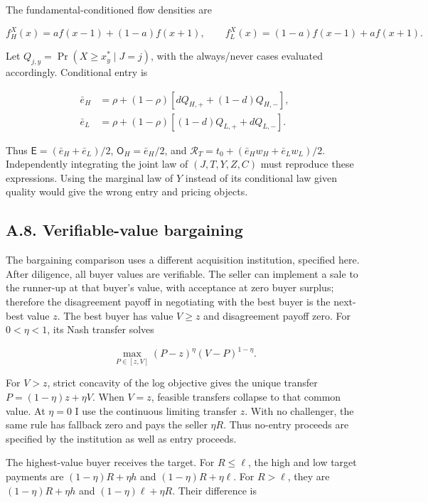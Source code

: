 \documentclass[
  11pt,
]{article}
\begin{document}
The fundamental-conditioned flow densities are

\[
f_H^X(x)=a f(x-1)+(1-a)f(x+1),\qquad
f_L^X(x)=(1-a)f(x-1)+a f(x+1).
\tag{OA.40}\label{eq:oa-oa-40}
\]

Let \(Q_{j,y}=\Pr(X\ge x_y^*\mid J=j)\), with the
always/never cases evaluated accordingly. Conditional entry is

\[
\begin{aligned}
\bar e_H&=\rho+(1-\rho)[dQ_{H,+}+(1-d)Q_{H,-}],\\
\bar e_L&=\rho+(1-\rho)[(1-d)Q_{L,+}+dQ_{L,-}].
\end{aligned}
\tag{OA.41}\label{eq:oa-oa-41}
\]

Thus \(\mathsf E=(\bar e_H+\bar e_L)/2\), \(\mathsf O_H=\bar e_H/2\),
and \(\mathcal R_T=t_0+(\bar e_Hw_H+\bar e_Lw_L)/2\). Independently
integrating the joint law of \((J,T,Y,Z,C)\) must reproduce these
expressions. Using the marginal law of \(Y\) instead of its conditional
law given quality would give the wrong entry and pricing objects.

\subsection{A.8. Verifiable-value bargaining}\label{oa-a-bargaining}

The bargaining comparison uses a different acquisition institution,
specified here. After diligence, all buyer values are verifiable. The
seller can implement a sale to the runner-up at that buyer's value, with
acceptance at zero buyer surplus; therefore the disagreement payoff in
negotiating with the best buyer is the next-best value \(z\). The best
buyer has value \(V\ge z\) and disagreement payoff zero. For
\(0<\eta<1\), its Nash transfer solves

\[
\max_{P\in[z,V]}(P-z)^\eta(V-P)^{1-\eta}.
\tag{OA.42}\label{eq:oa-oa-42}
\]

For \(V>z\), strict concavity of the log objective gives the unique
transfer \(P=(1-\eta)z+\eta V\). When \(V=z\), feasible transfers
collapse to that common value. At \(\eta=0\) I use the continuous
limiting transfer \(z\). With no challenger, the same rule has fallback
zero and pays the seller \(\eta R\). Thus no-entry proceeds are
specified by the institution as well as entry proceeds.

The highest-value buyer receives the target. For \(R\le\ell\), the high
and low target payments are \((1-\eta)R+\eta h\) and
\((1-\eta)R+\eta\ell\). For \(R>\ell\), they are \((1-\eta)R+\eta h\)
and \((1-\eta)\ell+\eta R\). Their difference is
\end{document}
